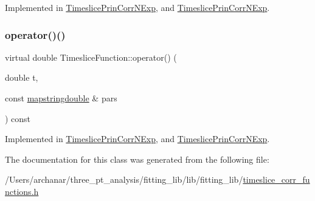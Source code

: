 Implemented in \mbox{\hyperlink{classTimeslicePrinCorrNExp_a3e258d5590d272f3f3dc735dd84c6702}{Timeslice\+Prin\+Corr\+N\+Exp}}, and \mbox{\hyperlink{classTimeslicePrinCorrNExp_a3e258d5590d272f3f3dc735dd84c6702}{Timeslice\+Prin\+Corr\+N\+Exp}}.

\mbox{\label{classTimesliceFunction_a0a71b38a0008247e9ed3726b466132c3}} 
\subsubsection{\texorpdfstring{operator()()}{operator()()}\hspace{0.1cm}{\footnotesize\ttfamily [4/4]}}
{\footnotesize\ttfamily virtual double Timeslice\+Function\+::operator() (\begin{DoxyParamCaption}\item[{double}]{t,  }\item[{const \mbox{\hyperlink{lib_2fitting__lib_2includes_8h_a647b481c557c7966517f753340a81d13}{mapstringdouble}} \&}]{pars }\end{DoxyParamCaption}) const\hspace{0.3cm}{\ttfamily [pure virtual]}}



Implemented in \mbox{\hyperlink{classTimeslicePrinCorrNExp_a3e258d5590d272f3f3dc735dd84c6702}{Timeslice\+Prin\+Corr\+N\+Exp}}, and \mbox{\hyperlink{classTimeslicePrinCorrNExp_a3e258d5590d272f3f3dc735dd84c6702}{Timeslice\+Prin\+Corr\+N\+Exp}}.



The documentation for this class was generated from the following file\+:\begin{DoxyCompactItemize}
\item 
/\+Users/archanar/three\+\_\+pt\+\_\+analysis/fitting\+\_\+lib/lib/fitting\+\_\+lib/\mbox{\hyperlink{lib_2fitting__lib_2timeslice__corr__functions_8h}{timeslice\+\_\+corr\+\_\+functions.\+h}}\end{DoxyCompactItemize}
